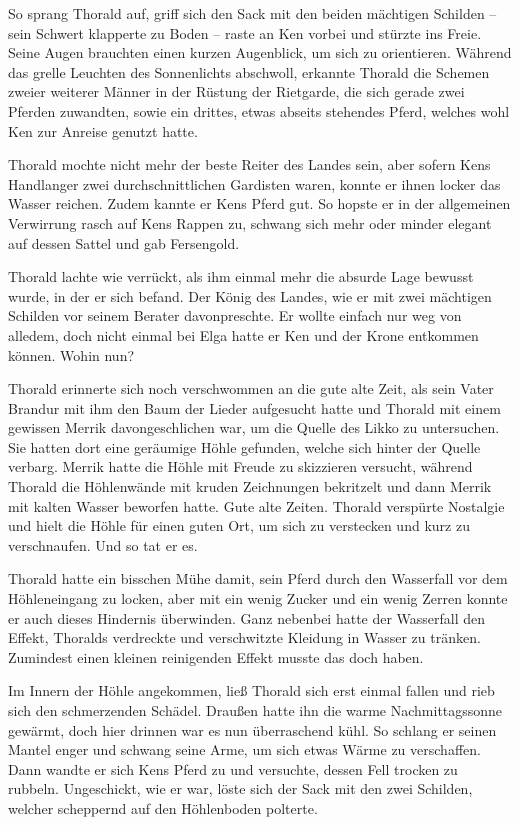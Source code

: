 So sprang Thorald auf, griff sich den Sack mit den beiden mächtigen Schilden – sein Schwert klapperte zu Boden – raste an Ken vorbei und stürzte ins Freie. Seine Augen brauchten einen kurzen Augenblick, um sich zu orientieren. Während das grelle Leuchten des Sonnenlichts abschwoll, erkannte Thorald die Schemen zweier weiterer Männer in der Rüstung der Rietgarde, die sich gerade zwei Pferden zuwandten, sowie ein drittes, etwas abseits stehendes Pferd, welches wohl Ken zur Anreise genutzt hatte.

Thorald mochte nicht mehr der beste Reiter des Landes sein, aber sofern Kens Handlanger zwei durchschnittlichen Gardisten waren, konnte er ihnen locker das Wasser reichen. Zudem kannte er Kens Pferd gut. So hopste er in der allgemeinen Verwirrung rasch auf Kens Rappen zu, schwang sich mehr oder minder elegant auf dessen Sattel und gab Fersengold.

Thorald lachte wie verrückt, als ihm einmal mehr die absurde Lage bewusst wurde, in der er sich befand. Der König des Landes, wie er mit zwei mächtigen Schilden vor seinem Berater davonpreschte. Er wollte einfach nur weg von alledem, doch nicht einmal bei Elga hatte er Ken und der Krone entkommen können. Wohin nun?

Thorald erinnerte sich noch verschwommen an die gute alte Zeit, als sein Vater Brandur mit ihm den Baum der Lieder aufgesucht hatte und Thorald mit einem gewissen Merrik davongeschlichen war, um die Quelle des Likko zu untersuchen. Sie hatten dort eine geräumige Höhle gefunden, welche sich hinter der Quelle verbarg. Merrik hatte die Höhle mit Freude zu skizzieren versucht, während Thorald die Höhlenwände mit kruden Zeichnungen bekritzelt und dann Merrik mit kalten Wasser beworfen hatte. Gute alte Zeiten. Thorald verspürte Nostalgie und hielt die Höhle für einen guten Ort, um sich zu verstecken und kurz zu verschnaufen. Und so tat er es.



\trennzeichen



Thorald hatte ein bisschen Mühe damit, sein Pferd durch den Wasserfall vor dem Höhleneingang zu locken, aber mit ein wenig Zucker und ein wenig Zerren konnte er auch dieses Hindernis überwinden. Ganz nebenbei hatte der Wasserfall den Effekt, Thoralds verdreckte und verschwitzte Kleidung in Wasser zu tränken. Zumindest einen kleinen reinigenden Effekt musste das doch haben.

Im Innern der Höhle angekommen, ließ Thorald sich erst einmal fallen und rieb sich den schmerzenden Schädel. Draußen hatte ihn die warme Nachmittagssonne gewärmt, doch hier drinnen war es nun überraschend kühl. So schlang er seinen Mantel enger und schwang seine Arme, um sich etwas Wärme zu verschaffen. Dann wandte er sich Kens Pferd zu und versuchte, dessen Fell trocken zu rubbeln. Ungeschickt, wie er war, löste sich der Sack mit den zwei Schilden, welcher scheppernd auf den Höhlenboden polterte.

